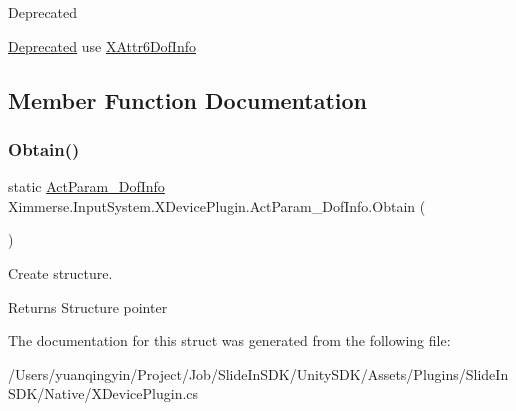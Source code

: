 \begin{DoxyRefDesc}{Deprecated}
\item[\mbox{\hyperlink{deprecated__deprecated000001}{Deprecated}}]use \mbox{\hyperlink{struct_ximmerse_1_1_input_system_1_1_x_device_plugin_1_1_x_attr6_dof_info}{X\+Attr6\+Dof\+Info}} \end{DoxyRefDesc}


\subsection{Member Function Documentation}
\mbox{\label{struct_ximmerse_1_1_input_system_1_1_x_device_plugin_1_1_act_param__6_dof_info_a91649d265d8ce0f1111d1df85620b872}} 
\subsubsection{\texorpdfstring{Obtain()}{Obtain()}}
{\footnotesize\ttfamily static \mbox{\hyperlink{struct_ximmerse_1_1_input_system_1_1_x_device_plugin_1_1_act_param__6_dof_info}{Act\+Param\+\_\+Dof\+Info}} Ximmerse.\+Input\+System.\+X\+Device\+Plugin.\+Act\+Param\+\_\+Dof\+Info.\+Obtain (\begin{DoxyParamCaption}{ }\end{DoxyParamCaption})\hspace{0.3cm}{\ttfamily [static]}}



Create structure. 

\begin{DoxyReturn}{Returns}
Structure pointer 
\end{DoxyReturn}


The documentation for this struct was generated from the following file\+:\begin{DoxyCompactItemize}
\item 
/\+Users/yuanqingyin/\+Project/\+Job/\+Slide\+In\+S\+D\+K/\+Unity\+S\+D\+K/\+Assets/\+Plugins/\+Slide\+In\+S\+D\+K/\+Native/X\+Device\+Plugin.\+cs\end{DoxyCompactItemize}
